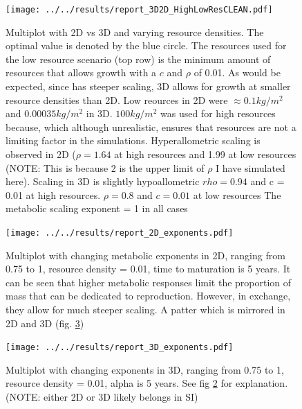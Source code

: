 \documentclass[a4paper, 11pt, hidelinks]{article} %
\begin{document}
	\begin{figure}[h!]
				
		\texttt{[image: ../../results/report\_3D2D\_HighLowResCLEAN.pdf]}
		
		\caption{Multiplot with 2D vs 3D and varying resource densities. The optimal value is denoted by the blue circle.
		The resources used for the low resource scenario (top row) is the minimum amount of resources that allows growth with a $c$ and $\rho$ of 0.01.  As would be expected, since has steeper scaling, 3D allows for growth at smaller resource densities than 2D.
		Low reources in 2D were $ \approx 0.1kg/m^2 $ and $ 0.00035kg/m^2 $ in 3D.
		$ 100kg/m^2 $ was used for high resources because, which although unrealistic, ensures that resources are not a limiting factor in the simulations.
		Hyperallometric scaling is observed in 2D ($\rho = 1.64$ at high resources and 1.99 at low resources (NOTE: This is because 2 is the upper limit of $\rho$ I have simulated here). 
		Scaling in 3D is slightly hypoallometric $rho = 0.94$ and c = 0.01 at high resources. $\rho = 0.8$ and $c = 0.01$ at low resources
		The metabolic scaling exponent = 1 in all cases}
		\label{resources2D3D}
	\end{figure}
	
	
	\begin{figure}[h!]
		
		\texttt{[image: ../../results/report\_2D\_exponents.pdf]}
		
		\caption{Multiplot with changing metabolic exponents in 2D, ranging from 0.75 to 1, resource density = 0.01, time to maturation is 5 years.  
		It can be seen that higher metabolic responses limit the proportion of mass that can be dedicated to reproduction.  However, in exchange, they allow for much steeper scaling.  A patter which is mirrored in 2D and 3D (fig. \ref{exponents3D})}
		\label{exponents2D}
	\end{figure}
		
	\begin{figure}[h!]
		
		\texttt{[image: ../../results/report\_3D\_exponents.pdf]}
		
		\caption{Multiplot with changing exponents in 3D, ranging from 0.75 to 1, resource density = 0.01, alpha is 5 years. See fig \ref{exponents2D} for explanation. (NOTE: either 2D or 3D likely belongs in SI) } %
		\label{exponents3D}
	\end{figure}
		
\end{document}
